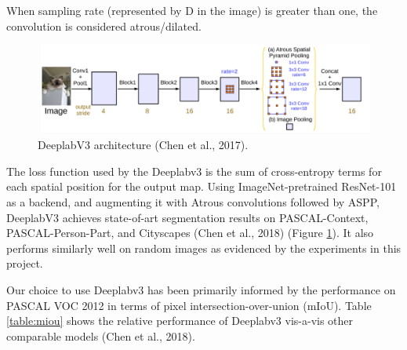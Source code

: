 \documentclass[
]{article}
\begin{document}
When sampling rate (represented by D in the image) is greater than one,
the convolution is considered atrous/dilated.

\begin{figure}
\centering
\includegraphics{report_images/deeplabv3.png}
\caption{DeeplabV3 architecture (Chen et al., 2017).}
\label{fig:deeplabv3}
\end{figure}

The loss function used by the Deeplabv3 is the sum of cross-entropy
terms for each spatial position for the output map. Using
ImageNet-pretrained ResNet-101 as a backend, and augmenting it with
Atrous convolutions followed by ASPP, DeeplabV3 achieves state-of-art
segmentation results on PASCAL-Context, PASCAL-Person-Part, and
Cityscapes (Chen et al., 2018) (Figure \ref{fig:deeplabv3}). It also performs similarly well on
random images as evidenced by the experiments in this project.

Our choice to use Deeplabv3 has been primarily informed by the
performance on PASCAL VOC 2012 in terms of pixel intersection-over-union
(mIoU). Table \ref{table:miou} shows the relative performance of Deeplabv3
vis-a-vis other comparable models (Chen et al., 2018).
\end{document}
